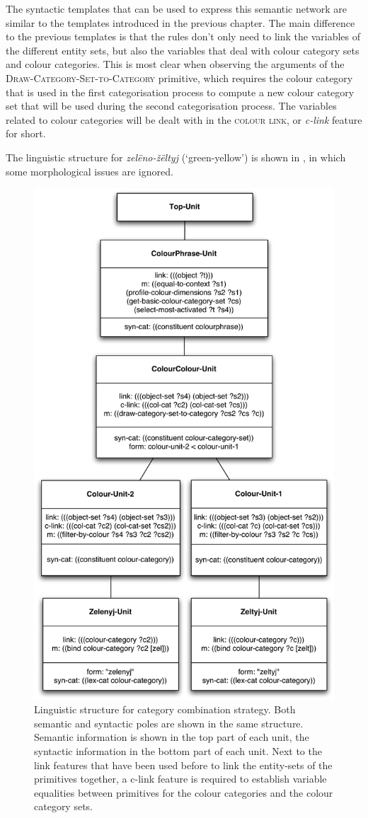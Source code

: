 The syntactic templates that can be used to express this semantic
network are similar to the templates introduced in the previous
chapter. The main difference to the previous templates is that the
rules don't only need to link the variables of the different entity
sets, but also the variables that deal with colour category sets and
colour categories. This is most clear when observing the arguments of
the \textsc{Draw-Category-Set-to-Category} primitive, which requires
the colour category that is used in the first categorisation process
to compute a new colour category set that will be used during the
second categorisation process. The variables related to colour
categories will be dealt with in the \textsc{colour link}, or
\emph{c-link} feature for short.

The linguistic structure for \textit{zel\"eno-\v z\"eltyj} (`green-yellow')
is shown in , in which some
morphological issues are ignored.

\begin{figure}[htbp]
  \centering
  \includegraphics[width=.70\textwidth]{./category-combination/figures/linguistic-structure.pdf}
  \caption[Linguistic structure for category combination
  strategy]{Linguistic structure for category combination
    strategy. Both semantic and syntactic poles are shown in the same
    structure. Semantic information is shown in the top part of each
    unit, the syntactic information in the bottom part of each
    unit. Next to the link features that have been used before to link
    the entity-sets of the primitives together, a c-link feature is
    required to establish variable equalities between primitives for
    the colour categories and the colour category sets.}
  \label{f:ccs-linguistic-structure}
\end{figure}

